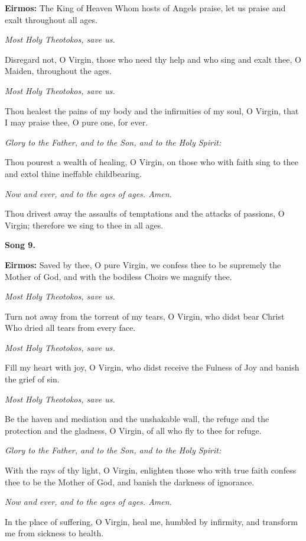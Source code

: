 \textbf{Eirmos:} 
The King of Heaven Whom hosts of Angels praise, let us praise and exalt throughout all ages.

\emph{Most Holy Theotokos, save us.}

Disregard not, O Virgin, those who need thy help and who sing and exalt thee, O Maiden, throughout the ages.

\emph{Most Holy Theotokos, save us.}

Thou healest the pains of my body and the infirmities of my soul, O Virgin, that I may praise thee, O pure one, for ever.

\emph{Glory to the Father, and to the Son, and to the Holy Spirit:}

Thou pourest a wealth of healing, O Virgin, on those who with faith sing to thee and extol thine ineffable childbearing.

\emph{Now and ever, and to the ages of ages. Amen.}

Thou drivest away the assaults of temptations and the attacks of passions, O Virgin; 
therefore we sing to thee in all ages.

\textbf{Song 9.}

\textbf{Eirmos:} 
Saved by thee, O pure Virgin, we confess thee to be supremely the Mother of God, and with the bodiless Choirs we magnify thee.

\emph{Most Holy Theotokos, save us.}

Turn not away from the torrent of my tears, O Virgin, who didst bear Christ Who dried all tears from every face.

\emph{Most Holy Theotokos, save us.}

Fill my heart with joy, O Virgin, who didst receive the Fulness of Joy and banish the grief of sin.

\emph{Most Holy Theotokos, save us.}

Be the haven and mediation and the unshakable wall, the refuge and the protection and the gladness, O Virgin, of all who fly to thee for refuge.

\emph{Glory to the Father, and to the Son, and to the Holy Spirit:}

With the rays of thy light, O Virgin, enlighten those who with true faith confess thee to be the Mother of God, and banish the darkness of ignorance.

\emph{Now and ever, and to the ages of ages. Amen.}

In the place of suffering, O Virgin, heal me, humbled by infirmity, and transform me from sickness to health.

